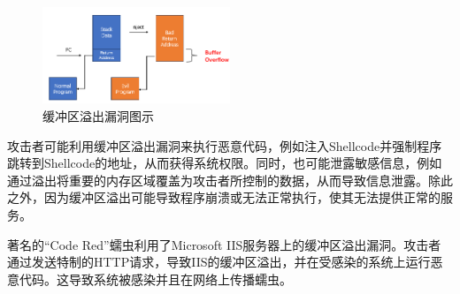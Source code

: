 \begin{figure}[htbp]
  \centering
  \includegraphics[width=0.5\textwidth]{pictures/Buffer Overflow.png}
  \caption{缓冲区溢出漏洞图示}
  \label{fig:BO}
\end{figure}
	
攻击者可能利用缓冲区溢出漏洞来执行恶意代码，例如注入Shellcode并强制程序跳转到Shellcode的地址，从而获得系统权限。同时，也可能泄露敏感信息，例如通过溢出将重要的内存区域覆盖为攻击者所控制的数据，从而导致信息泄露。除此之外，因为缓冲区溢出可能导致程序崩溃或无法正常执行，使其无法提供正常的服务。

著名的``Code Red''蠕虫利用了Microsoft
IIS服务器上的缓冲区溢出漏洞。攻击者通过发送特制的HTTP请求，导致IIS的缓冲区溢出，并在受感染的系统上运行恶意代码。这导致系统被感染并且在网络上传播蠕虫。
	